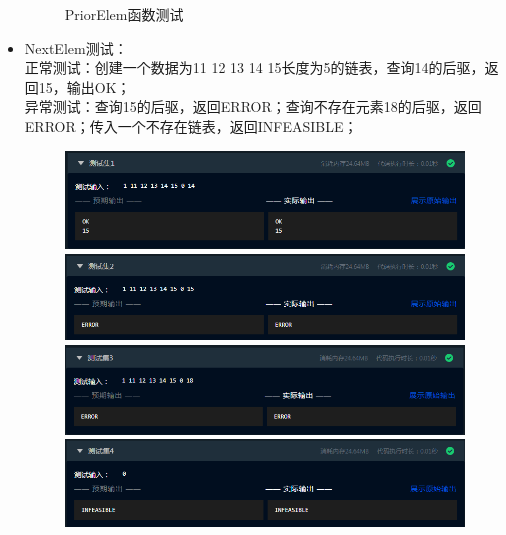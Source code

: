 \documentclass[supercite]{Experimental_Report}
\theoremstyle{definition}
\begin{document}
\begin{itemize}
\begin{figure}[htbp]
\begin{minipage}{0.9\linewidth}
		      \end{minipage}
		      \caption{PriorElem函数测试}
		      \label{fig1-11}
	      \end{figure}
	\item NextElem测试：\\正常测试：创建一个数据为11 12 13 14 15长度为5的链表，查询14的后驱，返回15，输出OK；\\异常测试：查询15的后驱，返回ERROR；查询不存在元素18的后驱，返回ERROR；传入一个不存在链表，返回INFEASIBLE；
	      \begin{figure}[htbp]
		      \centering
		      \begin{minipage}{0.9\linewidth}
			      \centering
			      \includegraphics[width=0.9\linewidth]{images/test-23.png}
		      \end{minipage}
		      \begin{minipage}{0.9\linewidth}
			      \centering
			      \includegraphics[width=0.9\linewidth]{images/test-24.png}
		      \end{minipage}
		      \begin{minipage}{0.9\linewidth}
			      \centering
			      \includegraphics[width=0.9\linewidth]{images/test-25.png}
		      \end{minipage}
		      \begin{minipage}{0.9\linewidth}
			      \centering
			      \includegraphics[width=0.9\linewidth]{images/test-26.png}

\end{minipage}
\end{figure}
\end{itemize}
\end{document}
